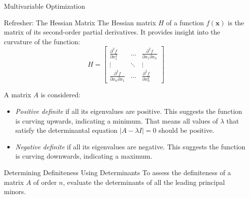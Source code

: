 \documentclass[
    NAME={Dr. Helga Ingimundardóttir},
    EMAIL={helgaingim@hi.is},
    FACULTY={Industrial Engineering},
    TITLE={Local and Global Optimization},
    SUBTITLE={Understanding Optima in Complex Landscapes},
    SEMINAR={VÉL113F},
    DATE={Design and Optimization},
    WIDE=true
]{../HI-latex/hi-beamer}
\begin{document}
\begin{frame}{Multivariable Optimization}
        \begin{block}{Refresher: The Hessian Matrix}
            The Hessian matrix \(H\) of a function \(f(\mathbf{x})\) is the matrix of its second-order partial derivatives. It provides insight into the curvature of the function:
            \[
                H = \begin{bmatrix}
                        \frac{\partial^2 f}{\partial x_1^2}            & \dots  & \frac{\partial^2 f}{\partial x_1 \partial x_n} \\
                        \vdots                                         & \ddots & \vdots                                         \\
                        \frac{\partial^2 f}{\partial x_n \partial x_1} & \dots  & \frac{\partial^2 f}{\partial x_n^2}
                \end{bmatrix}
            \]
        \end{block}
        \framebreak

        A matrix \(A\) is considered:
        \begin{itemize}
            \item \emph{Positive definite} if all its eigenvalues are positive. This suggests the function is curving upwards,
            indicating a minimum.
            That means all values of \(\lambda\) that satisfy the determinantal equation \(|A - \lambda I| = 0\) should be
            positive.
            \item \emph{Negative definite} if all its eigenvalues are negative. This suggests the function is curving
            downwards, indicating a maximum.
        \end{itemize}

        \framebreak

        \begin{block}{Determining Definiteness Using Determinants}
            To assess the definiteness of a matrix \(A\) of order \(n\), evaluate the determinants of all the leading principal minors.
        \end{block}


\end{frame}
\end{document}
